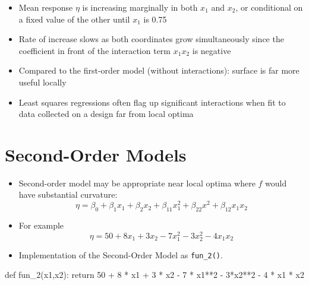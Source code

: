 \documentclass[
  letterpaper,
  DIV=11,
  numbers=noendperiod]{scrreprt}
\newenvironment{Shaded}{\begin{snugshade}}{\end{snugshade}}
\newcommand{\ControlFlowTok}[1]{\textcolor[rgb]{0.00,0.23,0.31}{#1}}
\newcommand{\DecValTok}[1]{\textcolor[rgb]{0.68,0.00,0.00}{#1}}
\newcommand{\KeywordTok}[1]{\textcolor[rgb]{0.00,0.23,0.31}{#1}}
\newcommand{\NormalTok}[1]{\textcolor[rgb]{0.00,0.23,0.31}{#1}}
\newcommand{\OperatorTok}[1]{\textcolor[rgb]{0.37,0.37,0.37}{#1}}
\providecommand{\tightlist}{%
  \setlength{\itemsep}{0pt}\setlength{\parskip}{0pt}}\usepackage{longtable,booktabs,array}
\begin{document}
\begin{itemize}
\tightlist
\item
  Mean response \(\eta\) is increasing marginally in both \(x_1\) and
  \(x_2\), or conditional on a fixed value of the other until \(x_1\) is
  0.75
\item
  Rate of increase slows as both coordinates grow simultaneously since
  the coefficient in front of the interaction term \(x_1 x_2\) is
  negative
\item
  Compared to the first-order model (without interactions): surface is
  far more useful locally
\item
  Least squares regressions often flag up significant interactions when
  fit to data collected on a design far from local optima
\end{itemize}

\section{Second-Order Models}\label{second-order-models}

\begin{itemize}
\item
  Second-order model may be appropriate near local optima where \(f\)
  would have substantial curvature:
  \[\eta = \beta_0 + \beta_1 x_1 + \beta_2 x_2  + \beta_{11}x_1^2 + \beta_{22}x^2 + \beta_{12} x_1 x_2\]
\item
  For example \[\eta = 50 + 8 x_1 + 3x_2 - 7x_1^2 - 3 x_2^2 - 4x_1x_2\]
\item
  Implementation of the Second-Order Model as \texttt{fun\_2()}.
\end{itemize}

\begin{Shaded}
\begin{Highlighting}[]
\KeywordTok{def}\NormalTok{ fun\_2(x1,x2):}
    \ControlFlowTok{return} \DecValTok{50} \OperatorTok{+} \DecValTok{8} \OperatorTok{*}\NormalTok{ x1 }\OperatorTok{+} \DecValTok{3} \OperatorTok{*}\NormalTok{ x2 }\OperatorTok{{-}} \DecValTok{7} \OperatorTok{*}\NormalTok{ x1}\OperatorTok{**}\DecValTok{2} \OperatorTok{{-}} \DecValTok{3}\OperatorTok{*}\NormalTok{x2}\OperatorTok{**}\DecValTok{2} \OperatorTok{{-}} \DecValTok{4} \OperatorTok{*}\NormalTok{ x1 }\OperatorTok{*}\NormalTok{ x2}
\end{Highlighting}
\end{Shaded}
\end{document}
